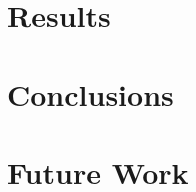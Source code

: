 \chapter{Results}\label{chap:res}
\chapter{Conclusions}\label{chap:conc}
\chapter{Future Work}\label{chap:fut}

